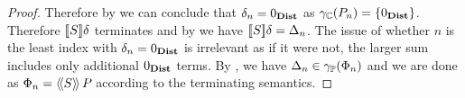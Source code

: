 \begin{proof}


%

Therefore by  we can conclude that
$ \delta_{n} = 0_{\textbf{Dist}} $ as $ \gamma_{\mathbb{C}}(P_{n}) = \left\{ 0_{\textbf{Dist}} \right\}
$. Therefore $ [\![{S}]\!]{\delta} $ terminates and
by  we have $ [\![{S}]\!]{\delta}
= \Delta_n $. The issue of whether $ n $ is the least index with
$ \delta_n = 0_{\textbf{Dist}} $ is irrelevant as if it were not, the larger
sum includes only additional $ 0_{\textbf{Dist}} $
terms. By , we have
$ \Delta_n \in \gamma_{\mathbb{P}}(\Phi_n) $ and we are done as $ \Phi_n
= \langle\!\langle{S}\rangle\!\rangle\,{P_{}} $ according to the terminating semantics.
\end{proof}

